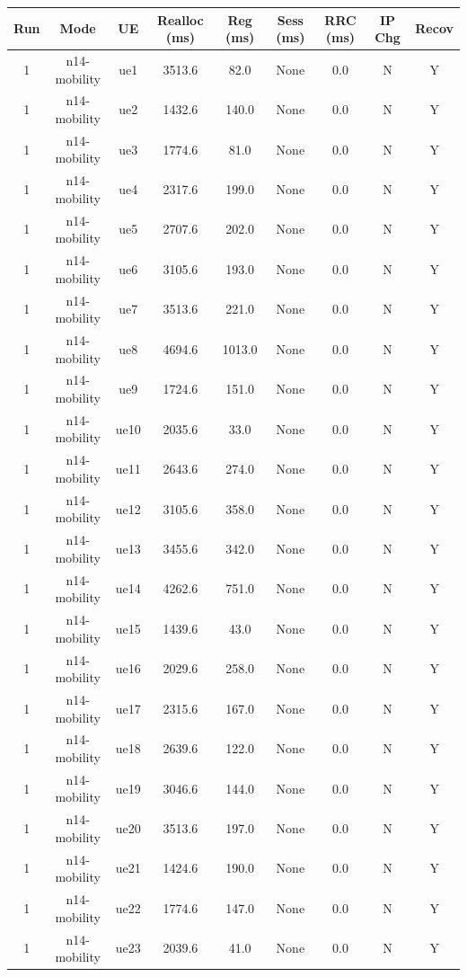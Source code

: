 \begin{table}[ht]
\centering
\begin{tabular}{|c|c|c|c|c|c|c|c|c|}
\hline
Run & Mode & UE & Realloc (ms) & Reg (ms) & Sess (ms) & RRC (ms) & IP Chg & Recov \\
\hline
1 & n14-mobility & ue1 & 3513.6 & 82.0 & None & 0.0 & N & Y \\
1 & n14-mobility & ue2 & 1432.6 & 140.0 & None & 0.0 & N & Y \\
1 & n14-mobility & ue3 & 1774.6 & 81.0 & None & 0.0 & N & Y \\
1 & n14-mobility & ue4 & 2317.6 & 199.0 & None & 0.0 & N & Y \\
1 & n14-mobility & ue5 & 2707.6 & 202.0 & None & 0.0 & N & Y \\
1 & n14-mobility & ue6 & 3105.6 & 193.0 & None & 0.0 & N & Y \\
1 & n14-mobility & ue7 & 3513.6 & 221.0 & None & 0.0 & N & Y \\
1 & n14-mobility & ue8 & 4694.6 & 1013.0 & None & 0.0 & N & Y \\
1 & n14-mobility & ue9 & 1724.6 & 151.0 & None & 0.0 & N & Y \\
1 & n14-mobility & ue10 & 2035.6 & 33.0 & None & 0.0 & N & Y \\
1 & n14-mobility & ue11 & 2643.6 & 274.0 & None & 0.0 & N & Y \\
1 & n14-mobility & ue12 & 3105.6 & 358.0 & None & 0.0 & N & Y \\
1 & n14-mobility & ue13 & 3455.6 & 342.0 & None & 0.0 & N & Y \\
1 & n14-mobility & ue14 & 4262.6 & 751.0 & None & 0.0 & N & Y \\
1 & n14-mobility & ue15 & 1439.6 & 43.0 & None & 0.0 & N & Y \\
1 & n14-mobility & ue16 & 2029.6 & 258.0 & None & 0.0 & N & Y \\
1 & n14-mobility & ue17 & 2315.6 & 167.0 & None & 0.0 & N & Y \\
1 & n14-mobility & ue18 & 2639.6 & 122.0 & None & 0.0 & N & Y \\
1 & n14-mobility & ue19 & 3046.6 & 144.0 & None & 0.0 & N & Y \\
1 & n14-mobility & ue20 & 3513.6 & 197.0 & None & 0.0 & N & Y \\
1 & n14-mobility & ue21 & 1424.6 & 190.0 & None & 0.0 & N & Y \\
1 & n14-mobility & ue22 & 1774.6 & 147.0 & None & 0.0 & N & Y \\
1 & n14-mobility & ue23 & 2039.6 & 41.0 & None & 0.0 & N & Y \\

\end{tabular}
\end{table}
